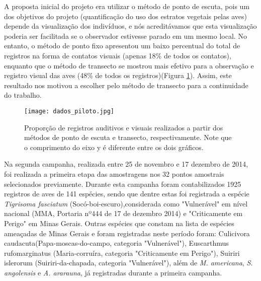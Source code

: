 A proposta inicial do projeto era utilizar o método de ponto de escuta, pois um dos objetivos do projeto (quantificação do uso dos estratos vegetais pelas aves) depende da visualização dos indivíduos, e nós acreditávamos que esta visualização poderia ser facilitada se o observador estivesse parado em um mesmo local. No entanto, o método de ponto fixo apresentou um baixo percentual do total de registros na forma de contatos visuais (apenas 18\% de todos os contatos), enquanto que o método de transecto se mostrou mais efetivo para a observação e registro visual das aves (48\% de todos os registros)(Figura \ref{fig:Figura 1}). Assim, este resultado nos motivou a escolher pelo método de transecto para a continuidade do trabalho.

\begin{figure}[hbtp]
\centering
\texttt{[image: dados\_piloto.jpg]}
\caption{Proporção de registros auditivos e visuais realizados a partir dos métodos de ponto de escuta e transecto, respectivamente. Note que o comprimento do eixo y é diferente entre os dois gráficos.}

\label{fig:Figura 1} 
\end{figure}


Na segunda campanha, realizada entre 25 de novembro e 17 dezembro de 2014, foi realizada a primeira etapa das amostragens nos 32 pontos amostrais selecionados previamente. Durante esta campanha foram contabilizados 1925 registros de aves de 141 espécies, sendo que dentre estas foi registrada a espécie \textit{Tigrisoma fasciatum} (Socó-boi-escuro),considerada como "Vulnerável" em nível nacional (MMA, Portaria nº444 de 17 de dezembro 2014) e "Criticamente em Perigo" em Minas Gerais. Outras espécies que constam na lista de espécies ameaçadas de Minas Gerais e foram registradas neste período foram: Culicivora caudacuta(Papa-moscas-do-campo, categoria "Vulnerável"), Euscarthmus rufomarginatus (Maria-corruíra, categoria "Criticamente em Perigo"), Suiriri islerorum (Suiriri-da-chapada, categoria "Vulnerável"), além de \textit{M. americana}, \textit{S. angolensis} e \textit{A. ararauna}, já registradas durante a primeira campanha.

